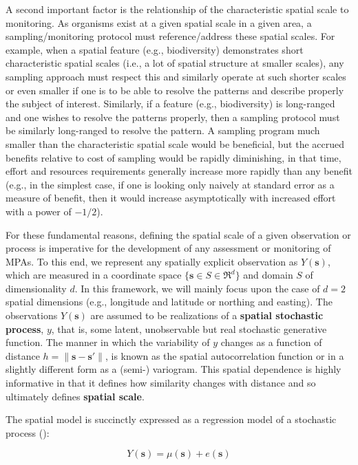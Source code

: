 \documentclass[letterpaper,portrait,11pt]{scrartcl}
\numberwithin{equation}{section}    %
\numberwithin{figure}{section}    %
\numberwithin{table}{section}       %
\begin{document}
A second important factor is the relationship of the characteristic spatial scale to monitoring. As organisms exist at a given spatial scale in a given area, a sampling/monitoring protocol must reference/address these spatial scales. For example, when a spatial feature (e.g., biodiversity) demonstrates short characteristic spatial scales (i.e., a lot of spatial structure at smaller scales), any sampling approach must respect this and similarly operate at such shorter scales or even smaller if one is to be able to resolve the patterns and describe properly the subject of interest. Similarly, if a feature (e.g., biodiversity) is long-ranged and one wishes to resolve the patterns properly, then a sampling protocol must be similarly long-ranged to resolve the pattern. A sampling program much smaller than the characteristic spatial scale would be beneficial, but the accrued benefits relative to cost of sampling would be rapidly diminishing, in that time, effort and resources requirements generally increase more rapidly than any benefit (e.g., in the simplest case, if one is looking only naively at standard error as a measure of benefit, then it would increase asymptotically with increased effort with a power of $-1/2$).

For these fundamental reasons, defining the spatial scale of a given observation or process is imperative for the development of any assessment or monitoring of MPAs. To this end, we represent any spatially explicit observation as $Y(\bm{s})$, which are measured in a coordinate space $\{ \bm{s} \in S \in \Re^d \}$ and domain $S$ of dimensionality $d$. In this framework, we will mainly focus upon the case of $d=2$ spatial dimensions (e.g., longitude and latitude or northing and easting). The observations $Y(\bm{s})$ are assumed to be realizations of a \textbf{spatial stochastic process}, $y$, that is, some latent, unobservable but real stochastic generative function. The manner in which the variability of $y$ changes as a function of distance $h=\| \bm{s} - \bm{s}' \|$, is known as the spatial autocorrelation function or in a slightly different form as a (semi-) variogram. This spatial dependence is highly informative in that it defines how similarity changes with distance and so ultimately defines \textbf{spatial scale}.

The spatial model is succinctly expressed as a regression model of a stochastic process (\cite{banerjee2014hierarchical}):

\begin{equation}
Y(\bm{s}) = \mu(\bm{s}) + e(\bm{s})
\label{eq:spatialModel}
\end{equation}
\end{document}
